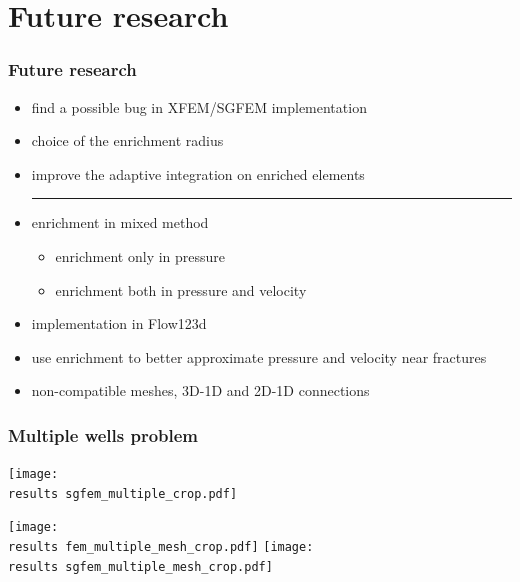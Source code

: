 \documentclass[10pt, xcolor=dvipsnames]{beamer} %
\newcommand{\results}{results/}
\begin{document}
\section{Future research}
\begin{frame}
  \frametitle{Future research}
  
  \begin{itemize}
  \setlength{\itemsep}{8pt}
    \item find a possible bug in XFEM/SGFEM implementation
    \item choice of the enrichment radius
    \item improve the adaptive integration on enriched elements
          \noindent\rule{\textwidth-1cm}{0.4pt}
    \item enrichment in mixed method
      \begin{itemize}
        \item enrichment only in pressure 
        \item enrichment both in pressure and velocity
      \end{itemize}
    \item implementation in Flow123d
    \item use enrichment to better approximate pressure and velocity near fractures
    \item non-compatible meshes, 3D-1D and 2D-1D connections
  \end{itemize}
\end{frame}

\begin{frame}
  \frametitle{Multiple wells problem}
  \vspace{-10pt}
 \begin{center}
  \begin{minipage}{\linewidth}
    \centering
    \texttt{[image: \\results sgfem\_multiple\_crop.pdf]}
  \end{minipage}

  \begin{minipage}{\linewidth}
    \centering
    \texttt{[image: \\results fem\_multiple\_mesh\_crop.pdf]}
    \texttt{[image: \\results sgfem\_multiple\_mesh\_crop.pdf]} 
  \end{minipage}
 \end{center}
\end{frame}
\end{document}
